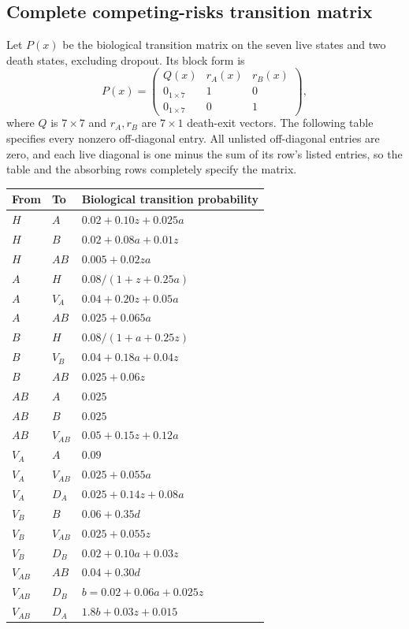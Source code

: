 \subsection{Complete competing-risks transition matrix}
Let $P(x)$ be the biological transition matrix on the seven live states and two death states, excluding dropout. Its block form is
\begin{equation}\label{eq:crmatrix}
P(x)=\begin{pmatrix}
Q(x)&r_A(x)&r_B(x)\\
0_{1\times7}&1&0\\
0_{1\times7}&0&1
\end{pmatrix},
\end{equation}
where $Q$ is $7\times7$ and $r_A,r_B$ are $7\times1$ death-exit vectors. The following table specifies every nonzero off-diagonal entry. All unlisted off-diagonal entries are zero, and each live diagonal is one minus the sum of its row's listed entries, so the table and the absorbing rows completely specify the matrix.

\begin{center}\begin{minipage}{\textwidth}\centering\small
\begin{tabular}{lll}\toprule
From & To & Biological transition probability\\\midrule
$H$ & $A$ & $0.02+0.10z+0.025a$\\
$H$ & $B$ & $0.02+0.08a+0.01z$\\
$H$ & $AB$ & $0.005+0.02za$\\
$A$ & $H$ & $0.08/(1+z+0.25a)$\\
$A$ & $V_A$ & $0.04+0.20z+0.05a$\\
$A$ & $AB$ & $0.025+0.065a$\\
$B$ & $H$ & $0.08/(1+a+0.25z)$\\
$B$ & $V_B$ & $0.04+0.18a+0.04z$\\
$B$ & $AB$ & $0.025+0.06z$\\
$AB$ & $A$ & $0.025$\\
$AB$ & $B$ & $0.025$\\
$AB$ & $V_{AB}$ & $0.05+0.15z+0.12a$\\
$V_A$ & $A$ & $0.09$\\
$V_A$ & $V_{AB}$ & $0.025+0.055a$\\
$V_A$ & $D_A$ & $0.025+0.14z+0.08a$\\
$V_B$ & $B$ & $0.06+0.35d$\\
$V_B$ & $V_{AB}$ & $0.025+0.055z$\\
$V_B$ & $D_B$ & $0.02+0.10a+0.03z$\\
$V_{AB}$ & $AB$ & $0.04+0.30d$\\
$V_{AB}$ & $D_B$ & $b=0.02+0.06a+0.025z$\\
$V_{AB}$ & $D_A$ & $1.8b+0.03z+0.015$\\\bottomrule
\end{tabular}
\end{minipage}\end{center}

